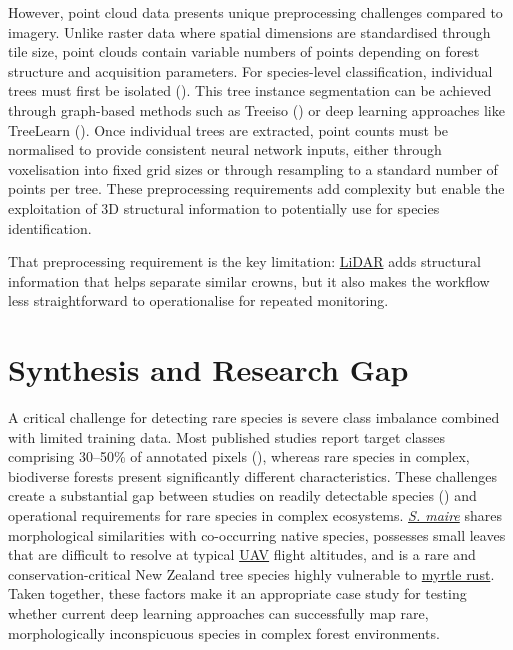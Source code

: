 \documentclass[
]{scrreprt}
\begin{document}
However, point cloud data presents unique preprocessing challenges
compared to imagery. Unlike raster data where spatial dimensions are
standardised through tile size, point clouds contain variable numbers of
points depending on forest structure and acquisition parameters. For
species-level classification, individual trees must first be isolated
().
This tree instance segmentation can be achieved through graph-based
methods such as Treeiso () or deep learning approaches like TreeLearn
(). Once
individual trees are extracted, point counts must be normalised to
provide consistent neural network inputs, either through voxelisation
into fixed grid sizes or through resampling to a standard number of
points per tree. These preprocessing requirements add complexity but
enable the exploitation of 3D structural information to potentially use
for species identification.

That preprocessing requirement is the key limitation:
\hyperref[acronyms_LiDAR]{LiDAR} adds structural information that helps
separate similar crowns, but it also makes the workflow less
straightforward to operationalise for repeated monitoring.

\section{Synthesis and Research Gap}\label{synthesis-and-research-gap}

A critical challenge for detecting rare species is severe class
imbalance combined with limited training data. Most published studies
report target classes comprising 30--50\% of annotated pixels
(),
whereas rare species in complex, biodiverse forests present
significantly different characteristics. These challenges create a
substantial gap between studies on readily detectable species
() and
operational requirements for rare species in complex ecosystems.
\hyperref[acronyms_SM]{\emph{S. maire}} shares morphological
similarities with co-occurring native species, possesses small leaves
that are difficult to resolve at typical \hyperref[acronyms_UAV]{UAV}
flight altitudes, and is a rare and conservation-critical New Zealand
tree species highly vulnerable to \hyperref[acronyms_MR]{myrtle rust}.
Taken together, these factors make it an appropriate case study for
testing whether current deep learning approaches can successfully map
rare, morphologically inconspicuous species in complex forest
environments.
\end{document}
